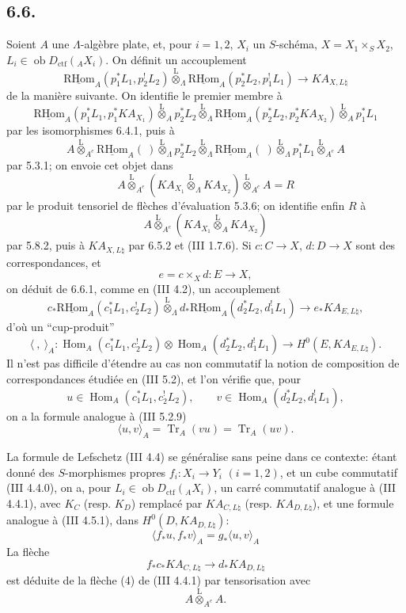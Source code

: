 \documentclass[11pt]{article}
\DeclareMathOperator{\Hom}{Hom}
\newcommand{\R}{\mathrm{R}}\newcommand{\RHomCore}{\mathrm{RHom}}
\providecommand{\RHom}{\RHomCore}
\providecommand{\uRHom}{\underline{\RHom}}
\providecommand{\Tr}{\operatorname{Tr}}
\providecommand{\Tr}{\operatorname{Tr}}
\providecommand{\lten}{\overset{\mathrm L}{\otimes}}
\providecommand{\Ob}{\operatorname{ob}}
\providecommand{\Tr}{\operatorname{Tr}}
\providecommand{\RHom}{\RHomCore}
\providecommand{\Hom}{\operatorname{Hom}}
\providecommand{\lten}{\overset{\mathrm L}{\otimes}}
\providecommand{\RHom}{\R\mathcal{H}om}
\providecommand{\lten}{\overset{\mathrm L}{\otimes}}
\providecommand{\Ob}{\operatorname{ob}}
\providecommand{\R}{\mathrm R}
\providecommand{\Tr}{\operatorname{Tr}}
\providecommand{\lten}{\overset{\mathrm L}{\otimes}}
\providecommand{\lten}{\overset{\mathrm L}{\otimes}}
\providecommand{\Ob}{\operatorname{Ob}}
\providecommand{\lten}{\overset{\mathrm L}{\otimes}}
\providecommand{\RHom}{\RHomCore}
\providecommand{\Hom}{\operatorname{Hom}}
\providecommand{\Tr}{\operatorname{Tr}}
\providecommand{\Ob}{\operatorname{ob}}
\providecommand{\Ob}{\operatorname{Ob}}
\providecommand{\lten}{\overset{\mathrm L}{\otimes}}
\begin{document}
\subsection*{6.6.}
Soient $A$ une $\Lambda$-algèbre plate, et, pour $i=1,2$, $X_i$ un $S$-schéma, $X=X_1\times_SX_2$, $L_i\in\Ob D_{\mathrm{ctf}}({}_AX_i)$. On définit un accouplement
\begin{equation}
\uRHom_A(p_1^*L_1,p_2^!L_2)
\lten_{\Lambda}
\uRHom_A(p_2^*L_2,p_1^!L_1)
\longrightarrow
KA_{X,L\natural}
\tag{6.6.1}
\end{equation}
de la manière suivante. On identifie le premier
membre à
\[
\uRHom_A(p_1^*L_1,p_1^*KA_{X_1})
\lten_A p_2^*L_2
\lten_{\Lambda}
\uRHom_A(p_2^*L_2,p_2^*KA_{X_2})
\lten_A p_1^*L_1
\]
par les isomorphismes 6.4.1, puis à
\[
A\lten_{A^e}\uRHom_A(\ )\lten_{\Lambda}p_2^*L_2
 \lten_{\Lambda}\uRHom_A(\ )\lten_{\Lambda}p_1^*L_1\lten_{A^e}A
\]
par 5.3.1; on envoie cet objet dans
\[
A\lten_{A^e}(KA_{X_1}\lten_{\Lambda}KA_{X_2})\lten_{A^e}A=R
\]
par le produit tensoriel de flèches d'évaluation 5.3.6; on identifie enfin $R$ à
\[
A\lten_{A^e}(KA_{X_1}\lten_A KA_{X_2})
\]
par 5.8.2, puis à $KA_{X,L\natural}$ par 6.5.2 et (III 1.7.6). Si $c:C\to X$, $d:D\to X$ sont des correspondances, et
\[
e=c\times_Xd:E\to X,
\]
on déduit de 6.6.1, comme en (III 4.2), un accouplement
\begin{equation}
c_*\uRHom_A(c_1^*L_1,c_2^!L_2)
\lten_{\Lambda}
d_*\uRHom_A(d_2^*L_2,d_1^!L_1)
\longrightarrow
e_*KA_{E,L\natural},
\tag{6.6.2}
\end{equation}
d'où un ``cup-produit''
\begin{equation}
\langle\ ,\ \rangle_A:
\Hom_A(c_1^*L_1,c_2^!L_2)\otimes
\Hom_A(d_2^*L_2,d_1^!L_1)
\longrightarrow
H^0(E,KA_{E,L\natural}).
\tag{6.6.3}
\end{equation}
Il n'est pas difficile d'étendre au cas non commutatif la notion de composition de correspondances étudiée en (III 5.2), et l'on vérifie que, pour
\[
u\in\Hom_A(c_1^*L_1,c_2^!L_2),\qquad
v\in\Hom_A(d_2^*L_2,d_1^!L_1),
\]
on a la formule analogue à (III 5.2.9)
\begin{equation}
\langle u,v\rangle_A=\Tr_A(vu)=\Tr_A(uv).
\tag{6.6.4}
\end{equation}

La formule de Lefschetz (III 4.4) se généralise sans peine dans ce contexte: étant donné des $S$-morphismes propres $f_i:X_i\to Y_i$ $(i=1,2)$, et un cube commutatif (III 4.4.0), on a, pour $L_i\in\Ob D_{\mathrm{ctf}}({}_AX_i)$, un carré commutatif analogue à (III 4.4.1), avec $K_C$ (resp. $K_D$) remplacé par $KA_{C,L\natural}$ (resp. $KA_{D,L\natural}$), et une formule analogue à (III 4.5.1), dans $H^0(D,KA_{D,L\natural})$:
\begin{equation}
\langle f_*u,f_*v\rangle_A=g_*\langle u,v\rangle_A
\tag{6.6.5}
\end{equation}
La flèche
\[
f_*c_*KA_{C,L\natural}\longrightarrow d_*KA_{D,L\natural}
\]
est déduite de la flèche (4) de (III 4.4.1) par tensorisation avec
\[
A\lten_{A^e}A .
\]
\end{document}

